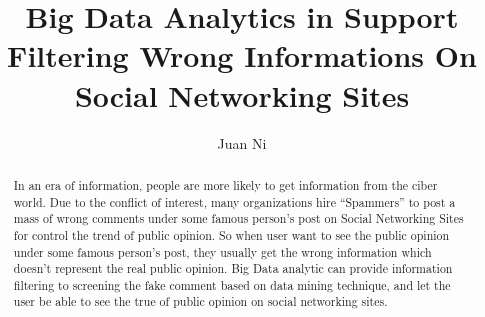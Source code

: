 \documentclass[sigconf]{acmart}
\begin{document}
\title{Big Data Analytics in Support Filtering Wrong Informations On Social Networking Sites}


\author{Juan Ni}




\begin{abstract}
In an era of information, people are more likely to get information from the ciber world.  Due to the conflict of interest,  many organizations hire  ``Spammers'' to post a mass of wrong comments under some famous person's post on Social Networking Sites for control the trend of public opinion\cite{abs:01}. So when user want to see the public opinion under some famous person's post, they usually get the wrong information which doesn't represent the real public opinion. Big Data analytic can provide information filtering to screening the fake comment based on data mining technique, and let the user be able to see the true of public opinion on social networking sites.
\end{abstract}



\maketitle
\end{document}
